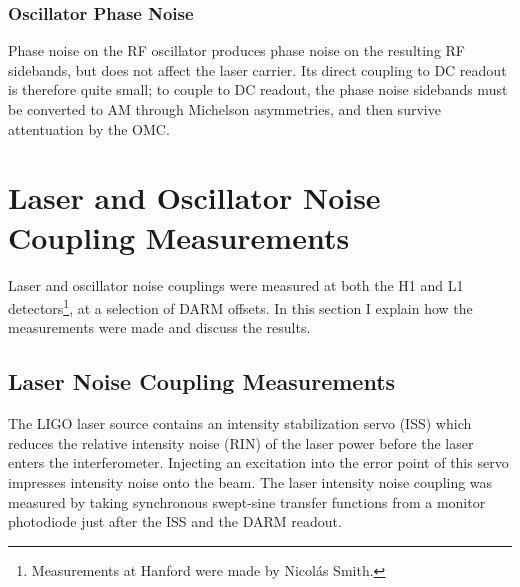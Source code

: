 \subsubsection{Oscillator Phase Noise}

Phase noise on the RF oscillator produces phase noise on the resulting
RF sidebands, but does not affect the laser carrier.  Its direct
coupling to DC readout is therefore quite small; to couple to DC
readout, the phase noise sidebands must be converted to AM through
Michelson asymmetries, and then survive attentuation by the OMC.

\section{Laser and Oscillator Noise Coupling Measurements}

Laser and oscillator noise couplings were measured at both the H1 and
L1 detectors\footnote{Measurements at Hanford were made by Nicol\'as
  Smith.}, at a selection of DARM offsets.  In this section I explain
how the measurements were made and discuss the results.

\subsection{Laser Noise Coupling Measurements}

The LIGO laser source contains an intensity stabilization servo (ISS)
which reduces the relative intensity noise (RIN) of the laser power
before the laser enters the interferometer.  Injecting an excitation
into the error point of this servo impresses intensity noise onto the
beam.  The laser intensity noise coupling was measured by taking
synchronous swept-sine transfer functions from a monitor photodiode
just after the ISS and the DARM readout.

